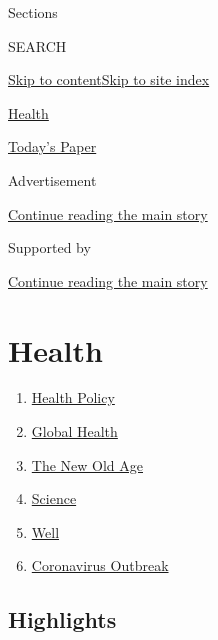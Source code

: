 Sections

SEARCH

\protect\hyperlink{site-content}{Skip to
content}\protect\hyperlink{site-index}{Skip to site index}

\href{https://www.nytimes3xbfgragh.onion/section/health}{Health}

\href{https://myaccount.nytimes3xbfgragh.onion/auth/login?response_type=cookie\&client_id=vi}{}

\href{https://www.nytimes3xbfgragh.onion/section/todayspaper}{Today's
Paper}

Advertisement

\protect\hyperlink{after-top}{Continue reading the main story}

Supported by

\protect\hyperlink{after-sponsor}{Continue reading the main story}

\hypertarget{health}{%
\section{Health}\label{health}}

\begin{enumerate}
\def\labelenumi{\arabic{enumi}.}
\tightlist
\item
  \href{/section/health/policy}{Health Policy}
\item
  \href{/column/global-health}{Global Health}
\item
  \href{/column/the-new-old-age}{The New Old Age}
\item
  \href{/section/science}{Science}
\item
  \href{/section/well/}{Well}
\item
  \href{/news-event/coronavirus}{Coronavirus Outbreak}
\end{enumerate}

\hypertarget{highlights}{%
\subsection{Highlights}\label{highlights}}

